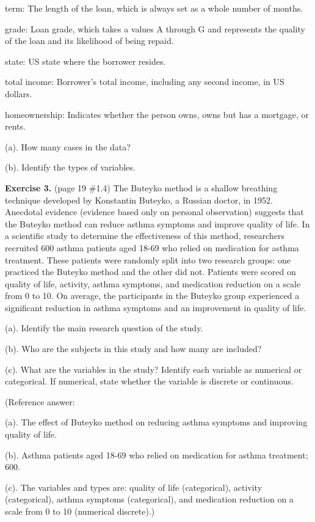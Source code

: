 \documentclass[
]{book}
\begin{document}
term: The length of the loan, which is always set as a whole number of months.

grade: Loan grade, which takes a values A through G and represents the quality of the loan and its likelihood of being repaid.

state: US state where the borrower resides.

total income: Borrower's total income, including any second income, in US dollars.

homeownership: Indicates whether the person owns, owns but has a mortgage, or rents.

(a). How many cases in the data?

(b). Identify the types of variables.

\textbf{Exercise 3.} (page 19 \#1.4) The Buteyko method is a shallow breathing technique developed by Konstantin Buteyko, a Russian doctor, in 1952. Anecdotal evidence (evidence based only on personal observation) suggests that the Buteyko method can reduce asthma symptoms and improve quality of life. In a scientific study to determine the effectiveness of this method, researchers recruited 600 asthma patients aged 18-69 who relied on medication for asthma treatment. These patients were randomly split into two research groups: one practiced the Buteyko method and the other did not. Patients were scored on quality of life, activity, asthma symptoms, and medication reduction on a scale from 0 to 10. On average, the participants in the Buteyko group experienced a significant reduction in asthma symptoms and an improvement in quality of life.

(a). Identify the main research question of the study.

(b). Who are the subjects in this study and how many are included?

(c). What are the variables in the study? Identify each variable as numerical or categorical. If numerical, state whether the variable is discrete or continuous.

(Reference answer:

(a). The effect of Buteyko method on reducing asthma symptoms and improving quality of life.

(b). Asthma patients aged 18-69 who relied on medication for asthma treatment; 600.

(c). The variables and types are: quality of life (categorical), activity (categorical), asthma symptoms (categorical), and medication reduction on a scale from 0 to 10 (numerical discrete).)
\end{document}
